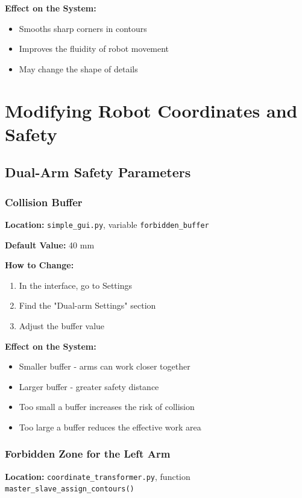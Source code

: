 \documentclass[a4paper,12pt]{article}
\begin{document}
\textbf{Effect on the System:}
\begin{itemize}
\item Smooths sharp corners in contours
\item Improves the fluidity of robot movement
\item May change the shape of details
\end{itemize}

\section{Modifying Robot Coordinates and Safety}

\subsection{Dual-Arm Safety Parameters}

\subsubsection{Collision Buffer}
\textbf{Location:} \texttt{simple\_gui.py}, variable \texttt{forbidden\_buffer}

\textbf{Default Value:} 40 mm

\textbf{How to Change:}
\begin{enumerate}
\item In the interface, go to Settings
\item Find the "Dual-arm Settings" section
\item Adjust the buffer value
\end{enumerate}

\textbf{Effect on the System:}
\begin{itemize}
\item Smaller buffer - arms can work closer together
\item Larger buffer - greater safety distance
\item Too small a buffer increases the risk of collision
\item Too large a buffer reduces the effective work area
\end{itemize}

\subsubsection{Forbidden Zone for the Left Arm}
\textbf{Location:} \texttt{coordinate\_transformer.py}, function \texttt{master\_slave\_assign\_contours()}
\end{document}
